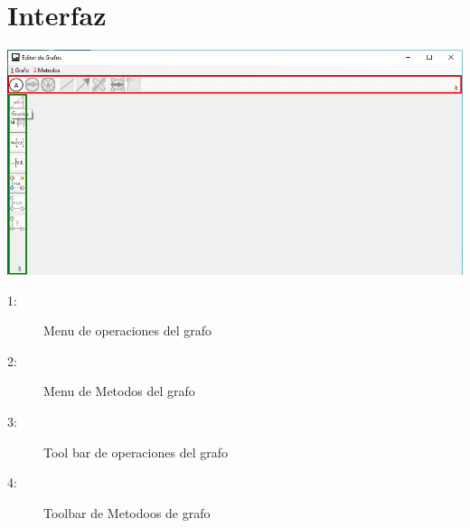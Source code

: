 \documentclass[titlepage]{report}
\begin{document}
\chapter*{Interfaz}
\begin{center}
\includegraphics[scale=.60]{Imagen/1.jpg} 
\end{center}
\begin{description}
\item[1:] Menu de operaciones del grafo
\item[2:] Menu de Metodos del grafo
\item[3:] Tool bar de operaciones del grafo
\item[4:] Toolbar de Metodoos de grafo
\end{description}
\end{document}
